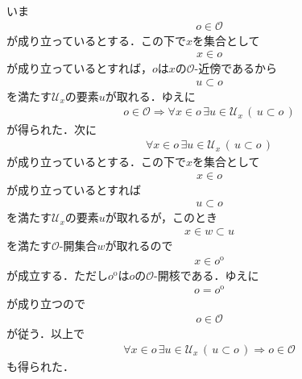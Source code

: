 	\begin{sketch}
		いま
		\begin{align}
			o \in \mathscr{O}
		\end{align}
		が成り立っているとする．この下で$x$を集合として
		\begin{align}
			x \in o
		\end{align}
		が成り立っているとすれば，$o$は$x$の$\mathscr{O}$-近傍であるから
		\begin{align}
			u \subset o
		\end{align}
		を満たす$\mathscr{U}_{x}$の要素$u$が取れる．ゆえに
		\begin{align}
			o \in \mathscr{O} \Longrightarrow
			\forall x \in o\, \exists u \in \mathscr{U}_{x}\, (\, u \subset o\, )
		\end{align}
		が得られた．次に
		\begin{align}
			\forall x \in o\, \exists u \in \mathscr{U}_{x}\, (\, u \subset o\, )
		\end{align}
		が成り立っているとする．この下で$x$を集合として
		\begin{align}
			x \in o
		\end{align}
		が成り立っているとすれば
		\begin{align}
			u \subset o
		\end{align}
		を満たす$\mathscr{U}_{x}$の要素$u$が取れるが，このとき
		\begin{align}
			x \in w \subset u
		\end{align}
		を満たす$\mathscr{O}$-開集合$w$が取れるので
		\begin{align}
			x \in o^{\mathrm{o}}
		\end{align}
		が成立する．ただし$o^{\mathrm{o}}$は$o$の$\mathscr{O}$-開核である．ゆえに
		\begin{align}
			o = o^{\mathrm{o}}
		\end{align}
		が成り立つので
		\begin{align}
			o \in \mathscr{O}
		\end{align}
		が従う．以上で
		\begin{align}
			\forall x \in o\, \exists u \in \mathscr{U}_{x}\, (\, u \subset o\, )
			\Longrightarrow o \in \mathscr{O}
		\end{align}
		も得られた．
		\QED
	\end{sketch}
	
